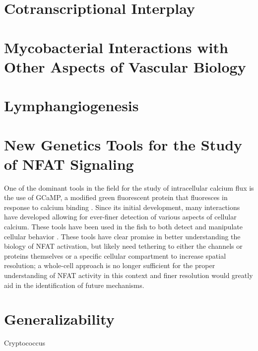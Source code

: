 \section{Cotranscriptional Interplay}

\section{Mycobacterial Interactions with Other Aspects of Vascular Biology}

\citep{Correa2014}
\citep{ClaessonWelsh2015}
\citep{Eklund2017}

\section{Lymphangiogenesis}

\citep{Alitalo2005}
\citep{Bower2017a}
\citep{Bower2017b}
\citep{Bussmann2010}
\citep{Campuzano2017}
\citep{Dietrich2007}
\citep{Duong2012}

\section{New Genetics Tools for the Study of NFAT Signaling}

One of the dominant tools in the field for the study of intracellular calcium flux is the use of GCaMP, a modified green fluorescent protein that fluoresces in response to calcium binding \citep{Nakai2001}. Since its initial development, many interactions have developed allowing for ever-finer detection of various aspects of cellular calcium. These tools have been used in the fish to both detect and manipulate cellular behavior \citep{Beerman2015}. These tools have clear promise in better understanding the biology of NFAT activation, but likely need tethering to either the channels or proteins themselves or a specific cellular compartment to increase spatial resolution; a whole-cell approach is no longer sufficient for the proper understanding of NFAT activity in this context and finer resolution would greatly aid in the identification of future mechanisms.

\section{Generalizability}

Cryptococcus

\citep{Bojarczuk2016}
